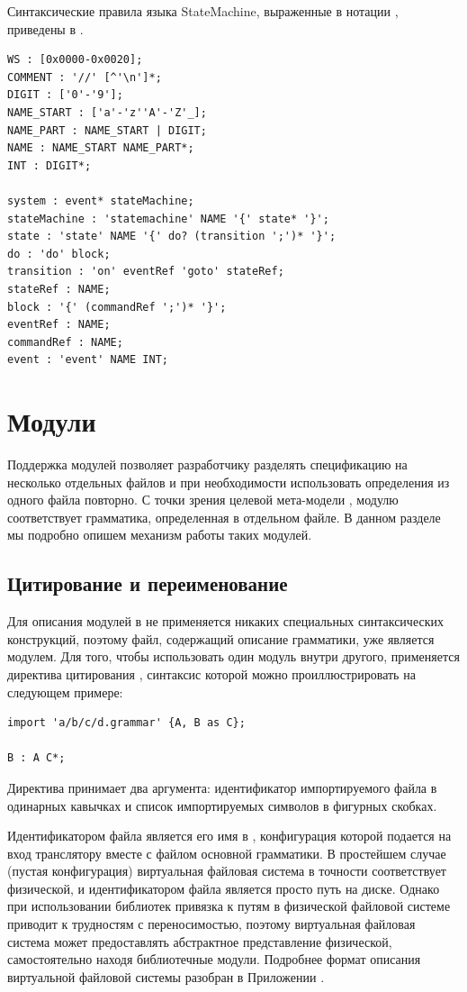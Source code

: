 Синтаксические правила языка StateMachine, выраженные в нотации , приведены в .

\begin{lstlisting}[xleftmargin=1cm,label=SMGram,caption=Грамматика языка StateMachine]
WS : [0x0000-0x0020];
COMMENT : '//' [^'\n']*;
DIGIT : ['0'-'9'];
NAME_START : ['a'-'z''A'-'Z'_];
NAME_PART : NAME_START | DIGIT;
NAME : NAME_START NAME_PART*;
INT : DIGIT*;

system : event* stateMachine;
stateMachine : 'statemachine' NAME '{' state* '}';
state : 'state' NAME '{' do? (transition ';')* '}';
do : 'do' block;
transition : 'on' eventRef 'goto' stateRef;
stateRef : NAME;
block : '{' (commandRef ';')* '}';
eventRef : NAME;
commandRef : NAME;
event : 'event' NAME INT;
\end{lstlisting}

\chapter{Модули}

Поддержка модулей позволяет разработчику разделять спецификацию на несколько отдельных файлов и при необходимости использовать определения из одного файла повторно.  С точки зрения целевой мета-модели , модулю соответствует грамматика, определенная в отдельном файле. В данном разделе мы подробно опишем механизм работы таких модулей.

\section{Цитирование и переименование}

Для описания модулей в  не применяется никаких специальных синтаксических конструкций, поэтому файл, содержащий описание грамматики, уже является модулем. Для того, чтобы использовать один модуль внутри другого, применяется директива цитирования , синтаксис которой можно проиллюстрировать на следующем примере:
\begin{lstlisting}
import 'a/b/c/d.grammar' {A, B as C};

B : A C*;
\end{lstlisting}  
Директива  принимает два аргумента: идентификатор импортируемого файла в одинарных кавычках и список импортируемых символов в фигурных скобках. 

Идентификатором файла является его имя в , конфигурация которой подается на вход транслятору  вместе с файлом основной грамматики. В простейшем случае (пустая конфигурация) виртуальная файловая система в точности соответствует физической, и идентификатором файла является просто путь на диске. Однако при использовании библиотек привязка к путям в физической файловой системе приводит к трудностям с переносимостью, поэтому виртуальная файловая система может предоставлять абстрактное представление физической, самостоятельно находя библиотечные модули. Подробнее формат описания виртуальной файловой системы разобран в Приложении .

